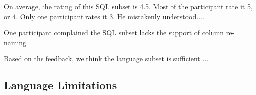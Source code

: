 On average, the rating of this SQL subset is 4.5. Most of
the participant rate it 5, or 4. Only one participant rates
it 3. He mistakenly understood....\todo{}

One participant complained the SQL subset lacks the support
of column re-naming

Based on the feedback, we think the language subset is
sufficient ...

\subsection{Language Limitations}

